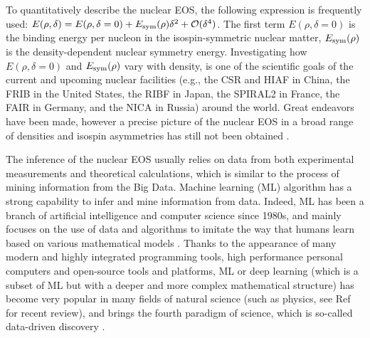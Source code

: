 \documentclass[twocolumn,aps,superscriptaddress]{revtex4}
\begin{document}
To quantitatively describe the nuclear EOS, the following expression is frequently used:
$E(\rho,\delta)=E(\rho,\delta=0) + E_{\rm sym}(\rho)\delta^{2} + \mathcal{O}(\delta^{4})$.
The first term $E(\rho,\delta=0)$ is the binding energy per nucleon in the isospin-symmetric nuclear matter, $E_{\rm sym}(\rho)$ is the density-dependent nuclear symmetry energy. Investigating how $E(\rho,\delta=0)$ and $E_{\rm sym}(\rho)$ vary with density, is one of the scientific goals of the current and upcoming nuclear facilities (e.g., the CSR and HIAF in China, the FRIB in the United States, the RIBF in Japan, the SPIRAL2 in France, the FAIR in Germany, and the NICA in Russia) around the world. Great endeavors have been made, however a precise picture of the nuclear EOS in a broad
range of densities and isospin asymmetries has still not been obtained \cite{li2008recent,tsang2012constraints,oertel2017equations}.


The inference of the nuclear EOS usually relies on data from both experimental measurements and theoretical calculations, which is similar to the process of mining information from the Big Data. Machine learning (ML) algorithm
has a strong capability to infer and mine information from data. Indeed, ML has been a branch of artificial intelligence and computer science since 1980s, and mainly focuses on the use of data and algorithms to imitate the way that humans learn based on various mathematical models \cite{jordan2015machine}. Thanks to the appearance of many modern and highly
integrated programming tools, high performance personal computers and open-source tools and platforms, ML or deep learning (which is a subset of ML but with a deeper and more complex mathematical structure) has become very
popular in many fields of natural science (such as physics, see Ref\cite{carleo2019machine} for recent review),
and brings the fourth paradigm of science, which is so-called data-driven discovery \cite{hey2009fourth}.
\end{document}
